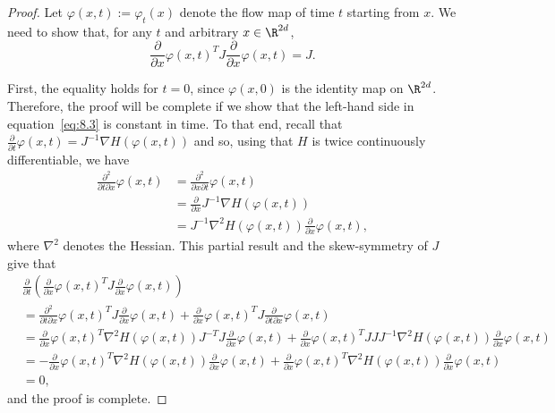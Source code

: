 \begin{proof}
Let $\varphi(x,t) := \varphi_t(x)$ denote the flow map of time $t$ starting from $x$. We
need to show that, for any $t$ and arbitrary $x \in \R^{2d}$,
\begin{equation}
\label{eq:8.3}
\frac{\partial}{\partial x}\varphi(x,t)^T J \frac{\partial}{\partial x}\varphi(x,t) = J.
\end{equation}

First, the equality holds for $t = 0$, since $\varphi(x,0)$ is the identity map on $\R^{2d}$.
Therefore, the proof will be complete if we show that the left-hand side in
equation~\eqref{eq:8.3} is constant in time. To that end, recall that
$\frac{\partial}{\partial t}\varphi(x,t) = J^{-1}\nabla H(\varphi(x,t))$ and so, using that
$H$ is twice continuously differentiable, we have
\begin{align*}
\frac{\partial^2}{\partial t \partial x}\varphi(x,t)
&= \frac{\partial^2}{\partial x \partial t}\varphi(x,t) \\
&= \frac{\partial}{\partial x} J^{-1}\nabla H(\varphi(x,t)) \\
&= J^{-1}\nabla^2 H\!\left(\varphi(x,t)\right)\frac{\partial}{\partial x}\varphi(x,t),
\end{align*}
where $\nabla^2$ denotes the Hessian. This partial result and the skew-symmetry of $J$ give that
\begin{align*}
&\frac{\partial}{\partial t}\!\left(\frac{\partial}{\partial x}\varphi(x,t)^T J
  \frac{\partial}{\partial x}\varphi(x,t)\right) \\
&= \frac{\partial^2}{\partial t\partial x}\varphi(x,t)^T J
  \frac{\partial}{\partial x}\varphi(x,t)
  + \frac{\partial}{\partial x}\varphi(x,t)^T J
  \frac{\partial}{\partial t\partial x}\varphi(x,t) \\
&= \frac{\partial}{\partial x}\varphi(x,t)^T \nabla^2 H\!\left(\varphi(x,t)\right)
  J^{-T} J \frac{\partial}{\partial x}\varphi(x,t)
  + \frac{\partial}{\partial x}\varphi(x,t)^T J J J^{-1}\nabla^2 H\!\left(\varphi(x,t)\right)
  \frac{\partial}{\partial x}\varphi(x,t) \\
&= -\frac{\partial}{\partial x}\varphi(x,t)^T \nabla^2 H\!\left(\varphi(x,t)\right)
  \frac{\partial}{\partial x}\varphi(x,t)
  + \frac{\partial}{\partial x}\varphi(x,t)^T \nabla^2 H\!\left(\varphi(x,t)\right)
  \frac{\partial}{\partial x}\varphi(x,t) \\
&= 0,
\end{align*}
and the proof is complete.
\end{proof}

